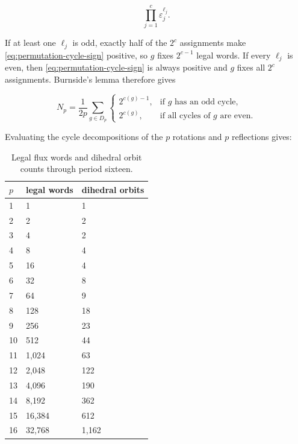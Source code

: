 \begin{equation}
\label{eq:permutation-cycle-sign}
\prod_{j=1}^c \varepsilon_j^{\ell_j}.
\end{equation}

If at least one \(\ell_j\) is odd, exactly half of the \(2^c\) assignments make
\eqref{eq:permutation-cycle-sign} positive, so \(g\) fixes \(2^{c-1}\) legal words. If every \(\ell_j\) is even,
then \eqref{eq:permutation-cycle-sign} is always positive and \(g\) fixes all \(2^c\) assignments. Burnside's
lemma therefore gives

\begin{equation}
\label{eq:burnside-orbit-count}
N_p=\frac{1}{2p}\sum_{g\in D_p}\begin{cases}2^{c(g)-1}, & \text{if }g\text{ has an odd cycle}, \\
2^{c(g)}, & \text{if all cycles of }g\text{ are even}.\end{cases}
\end{equation}

Evaluating the cycle decompositions of the \(p\) rotations and \(p\) reflections
gives:

\begin{table}[tbp]
\centering
\caption{Legal flux words and dihedral orbit counts through period sixteen.}
\label{tab:low-period-orbit-counts}
\begingroup
\renewcommand{\arraystretch}{1.12}
\begin{tabular}{lll}
\toprule
\(p\) & legal words & dihedral orbits \\
\midrule
1 & 1 & 1 \\
2 & 2 & 2 \\
3 & 4 & 2 \\
4 & 8 & 4 \\
5 & 16 & 4 \\
6 & 32 & 8 \\
7 & 64 & 9 \\
8 & 128 & 18 \\
9 & 256 & 23 \\
10 & 512 & 44 \\
11 & 1,024 & 63 \\
12 & 2,048 & 122 \\
13 & 4,096 & 190 \\
14 & 8,192 & 362 \\
15 & 16,384 & 612 \\
16 & 32,768 & 1,162 \\
\bottomrule
\end{tabular}
\endgroup
\end{table}

